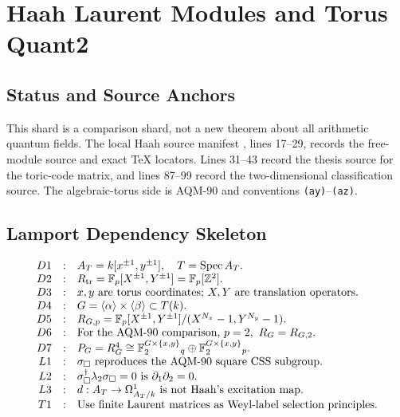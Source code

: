 
\section{Haah Laurent Modules and Torus Quant2}
\label{sec:haah-laurent-torus-quant2}

\subsection{Status and Source Anchors}

This shard is a comparison shard, not a new theorem about all arithmetic
quantum fields.  The local Haah source manifest
, lines 17--29, records
the free-module source and exact TeX locators.  Lines 31--43 record the thesis
source for the toric-code matrix, and lines 87--99 record the two-dimensional
classification source.  The algebraic-torus side is AQM-90 and conventions
\texttt{(ay)}--\texttt{(az)}.

\subsection{Lamport Dependency Skeleton}
\[
\begin{array}{rcl}
D1&:&A_T=k[x^{\pm1},y^{\pm1}],\quad T=\operatorname{Spec} A_T.\\
D2&:&R_{\rm tr}=\mathbb F_p[X^{\pm1},Y^{\pm1}]=\mathbb F_p[\mathbb Z^2].\\
D3&:&x,y\text{ are torus coordinates; }X,Y\text{ are translation operators.}\\
D4&:&G=\langle\alpha\rangle\times\langle\beta\rangle\subset T(k).\\
D5&:&R_{G,p}=\mathbb F_p[X^{\pm1},Y^{\pm1}]/(X^{N_x}-1,Y^{N_y}-1).\\
D6&:&\text{For the AQM-90 comparison, }p=2,\ R_G=R_{G,2}.\\
D7&:&P_G=R_G^4\cong
\mathbb F_2^{G\times\{x,y\}}{}_q\oplus
\mathbb F_2^{G\times\{x,y\}}{}_p.\\
L1&:&\sigma_\square\text{ reproduces the AQM-90 square CSS subgroup.}\\
L2&:&\sigma_\square^\dagger\lambda_2\sigma_\square=0
\text{ is }\partial_1\partial_2=0.\\
L3&:&d:A_T\to\Omega^1_{A_T/k}\text{ is not Haah's excitation map.}\\
T1&:&\text{Use finite Laurent matrices as Weyl-label selection principles.}
\end{array}
\]

